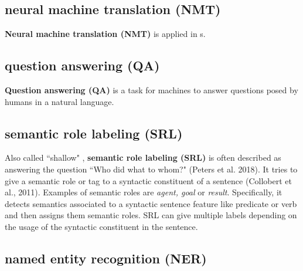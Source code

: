 \subsection{neural machine translation (NMT)} \label{nlptask:neuralmachinetranslationNMT}

\textbf{Neural machine translation (NMT)} is  applied in s. 

\subsection{question answering (QA)} \label{nlptask:questionansweringQA}

\textbf{Question answering (QA)} is a task for machines to answer questions posed by humans in a natural language. 


\subsection{semantic role labeling (SRL)} \label{nlptask:semanticrolelabelingSRL}

Also called ``shallow"  , \textbf{semantic role labeling (SRL)} is often described as answering the question ``Who did what to whom?" (Peters et al. 2018). It tries to give a semantic role or tag to a syntactic constituent of a sentence (Collobert et al., 2011).  Examples of semantic roles are \emph{agent, goal} or \emph{result}. Specifically, it detects semantics associated to a syntactic sentence feature like predicate or verb and then assigns them semantic roles. 
SRL can give multiple labels depending on the usage of the syntactic constituent in the sentence. 

%     




\subsection{named entity recognition (NER)} \label{nlptask:namedentityrecognitionNER}

